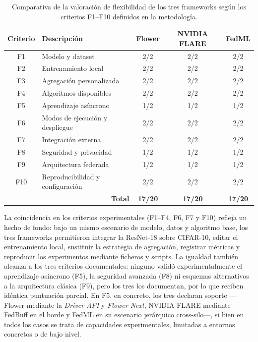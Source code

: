 \begin{table}[htbp]
  \centering
  \caption{Comparativa de la valoración de flexibilidad de los tres frameworks según
  los criterios F1--F10 definidos en la metodología.}
  \label{tab:flex-comparativa}
  \begin{tabular}{clccc}
    \toprule
    \textbf{Criterio} & \textbf{Descripción} & \textbf{Flower} & \textbf{NVIDIA FLARE} & \textbf{FedML} \\
    \midrule
    F1  & Modelo y dataset                  & 2/2 & 2/2 & 2/2 \\
    F2  & Entrenamiento local               & 2/2 & 2/2 & 2/2 \\
    F3  & Agregación personalizada          & 2/2 & 2/2 & 2/2 \\
    F4  & Algoritmos disponibles            & 2/2 & 2/2 & 2/2 \\
    F5  & Aprendizaje asíncrono             & 1/2 & 1/2 & 1/2 \\
    F6  & Modos de ejecución y despliegue   & 2/2 & 2/2 & 2/2 \\
    F7  & Integración externa               & 2/2 & 2/2 & 2/2 \\
    F8  & Seguridad y privacidad            & 1/2 & 1/2 & 1/2 \\
    F9  & Arquitectura federada             & 1/2 & 1/2 & 1/2 \\
    F10 & Reproducibilidad y configuración  & 2/2 & 2/2 & 2/2 \\
    \midrule
    \multicolumn{2}{r}{\textbf{Total}} & \textbf{17/20} & \textbf{17/20} & \textbf{17/20} \\
    \bottomrule
  \end{tabular}
\end{table}

La coincidencia en los criterios experimentales (F1--F4, F6, F7 y F10) refleja un
hecho de fondo: bajo un mismo escenario de modelo, datos y algoritmo base, los tres
frameworks permitieron integrar la ResNet-18 sobre CIFAR-10, editar el entrenamiento
local, sustituir la estrategia de agregación, registrar métricas y reproducir los
experimentos mediante ficheros y scripts. La igualdad también alcanza a los tres
criterios documentales: ninguno validó experimentalmente el aprendizaje asíncrono (F5),
la seguridad avanzada (F8) ni esquemas alternativos a la arquitectura clásica (F9), pero
los tres los documentan, por lo que reciben idéntica puntuación parcial. En F5, en
concreto, los tres declaran soporte —Flower mediante la \textit{Driver API} y
\textit{Flower Next}, NVIDIA FLARE mediante FedBuff en el borde y FedML en su escenario
jerárquico cross-silo—, si bien en todos los casos se trata de capacidades
experimentales, limitadas a entornos concretos o de bajo nivel.


